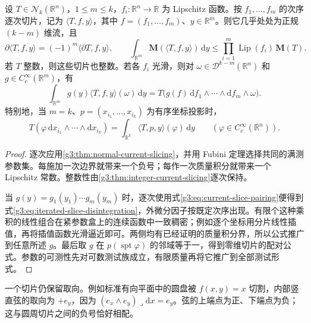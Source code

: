 \begin{proposition}\label{g3:prop:iterated-current-slicing}
	设 \(T\in\mathcal N_k(\mathbb R^n)\)，\(1\le m\le k\)，\(f_i:\mathbb R^n\to\mathbb R\) 为 Lipschitz 函数。按 \(f_1,\ldots,f_m\) 的次序逐次切片，记为 \(\langle T,f,y\rangle\)，其中 \(f=(f_1,\ldots,f_m)\)、\(y\in\mathbb R^m\)。则它几乎处处为正规 \((k-m)\) 维流，且
	\[
		\partial\langle T,f,y\rangle=(-1)^m\langle\partial T,f,y\rangle,
		\qquad
		\int_{\mathbb R^m}\mathbf M(\langle T,f,y\rangle)\,\mathrm dy
		\le\prod_{i=1}^m\operatorname{Lip}(f_i)\,\mathbf M(T).
	\]
	若 \(T\) 整数，则这些切片也整数。若各 \(f_i\) 光滑，则对 \(\omega\in\mathcal D^{k-m}(\mathbb R^n)\) 和 \(g\in C_c^\infty(\mathbb R^m)\)，有
	\begin{equation}\label{g3:eq:iterated-slice-disintegration}
		\int_{\mathbb R^m}g(y)\langle T,f,y\rangle(\omega)\,\mathrm dy
		=T\bigl(g(f)\,\mathrm df_1\wedge\cdots\wedge\mathrm df_m\wedge\omega\bigr).
	\end{equation}
	特别地，当 \(m=k\)、\(p=(x_{i_1},\ldots,x_{i_k})\) 为有序坐标投影时，
	\[
		T(\varphi\,\mathrm dx_{i_1}\wedge\cdots\wedge\mathrm dx_{i_k})
		=\int_{\mathbb R^k}\langle T,p,y\rangle(\varphi)\,\mathrm dy
		\qquad(\varphi\in C_c^\infty(\mathbb R^n)).
	\]
\end{proposition}
\begin{proof}
	逐次应用\cref{g3:thm:normal-current-slicing}，并用 Fubini 定理选择共同的满测参数集。每施加一次边界就带来一个负号；每作一次质量积分就带来一个 Lipschitz 常数。整数性由\cref{g3:thm:integer-current-slicing}逐次保持。

	当 \(g(y)=g_1(y_1)\cdots g_m(y_m)\) 时，逐次使用式\eqref{g3:eq:current-slice-pairing}便得到式\eqref{g3:eq:iterated-slice-disintegration}，外微分因子按既定次序出现。有限个这种乘积的线性组合在紧参数盒上的连续函数中一致稠密；例如逐个坐标用分片线性插值，再将插值函数光滑逼近即可。两侧均有已经证明的质量积分界，所以公式推广到任意所述 \(g\)。最后取 \(g\) 在 \(p(\operatorname{spt}\varphi)\) 的邻域等于一，得到零维切片的配对公式。参数的可测性先对可数测试族成立，有限质量再将它推广到全部测试形式。
\end{proof}

一个切片仍保留取向。例如标准有向平面中的圆盘被 \(f(x,y)=x\) 切割，内部竖直弦的取向为 \(+e_y\)，因为 \((e_x\wedge e_y)\mathbin{\lrcorner}\mathrm dx=e_y\)。弦的上端点为正、下端点为负；这与圆周切片之间的负号恰好相配。

